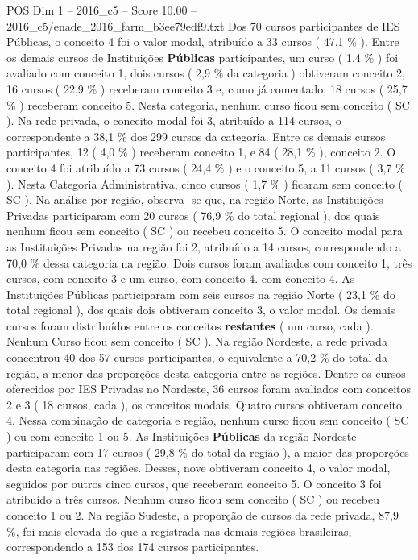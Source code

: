 \begin{textsample}{POS Dim 1 – 2016\_c5 – Score 10.00 – 2016\_c5/enade\_2016\_farm\_b3ee79edf9.txt}
Dos 70 cursos participantes de IES Públicas, o conceito 4 foi o valor modal, atribuído a 33 cursos ( 47,1 \% ).
Entre os demais cursos de Instituições \textbf{Públicas} participantes, um curso ( 1,4 \% ) foi avaliado com conceito 1, dois cursos ( 2,9 \% da categoria ) obtiveram conceito 2, 16 cursos ( 22,9 \% ) receberam conceito 3 e, como já comentado, 18 cursos ( 25,7 \% ) receberam conceito 5.
Nesta categoria, nenhum curso ficou sem conceito ( SC ).
Na rede privada, o conceito modal foi 3, atribuído a 114 cursos, o correspondente a 38,1 \% dos 299 cursos da categoria.
Entre os demais cursos participantes, 12 ( 4,0 \% ) receberam conceito 1, e 84 ( 28,1 \% ), conceito 2.
O conceito 4 foi atribuído a 73 cursos ( 24,4 \% ) e o conceito 5, a 11 cursos ( 3,7 \% ).
Nesta Categoria Administrativa, cinco cursos ( 1,7 \% ) ficaram sem conceito ( SC ).
Na análise por região, observa -se que, na região Norte, as Instituições Privadas participaram com 20 cursos ( 76,9 \% do total regional ), dos quais nenhum ficou sem conceito ( SC ) ou recebeu conceito 5.
O conceito modal para as Instituições Privadas na região foi 2, atribuído a 14 cursos, correspondendo a 70,0 \% dessa categoria na região.
Dois cursos foram avaliados com conceito 1, três cursos, com conceito 3 e um curso, com conceito 4. com conceito 4.
As Instituições Públicas participaram com seis cursos na região Norte ( 23,1 \% do total regional ), dos quais dois obtiveram conceito 3, o valor modal.
Os demais cursos foram distribuídos entre os conceitos \textbf{restantes} ( um curso, cada ).
Nenhum Curso ficou sem conceito ( SC ).
Na região Nordeste, a rede privada concentrou 40 dos 57 cursos participantes, o equivalente a 70,2 \% do total da região, a menor das proporções desta categoria entre as regiões.
Dentre os cursos oferecidos por IES Privadas no Nordeste, 36 cursos foram avaliados com conceitos 2 e 3 ( 18 cursos, cada ), os conceitos modais.
Quatro cursos obtiveram conceito 4.
Nessa combinação de categoria e região, nenhum curso ficou sem conceito ( SC ) ou com conceito 1 ou 5.
As Instituições \textbf{Públicas} da região Nordeste participaram com 17 cursos ( 29,8 \% do total da região ), a maior das proporções desta categoria nas regiões.
Desses, nove obtiveram conceito 4, o valor modal, seguidos por outros cinco cursos, que receberam conceito 5.
O conceito 3 foi atribuído a três cursos.
Nenhum curso ficou sem conceito ( SC ) ou recebeu conceito 1 ou 2.
Na região Sudeste, a proporção de cursos da rede privada, 87,9 \%, foi mais elevada do que a registrada nas demais regiões brasileiras, correspondendo a 153 dos 174 cursos participantes.

\end{textsample}
